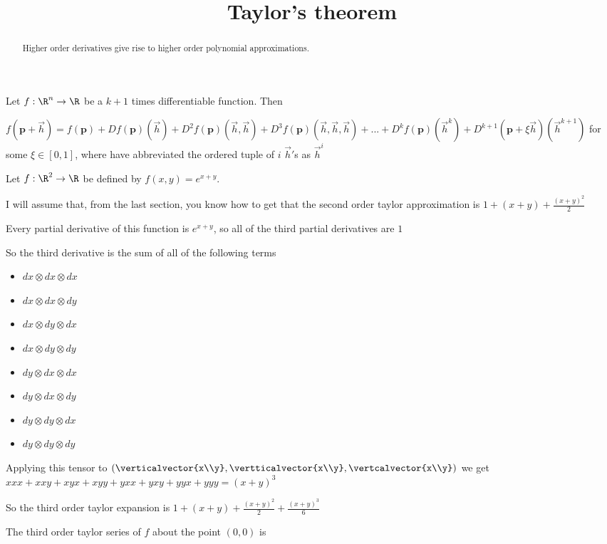 \documentclass{ximera}
\title{Taylor's theorem}
\begin{document}
\begin{abstract}
	Higher order derivatives give rise to higher order polynomial approximations.
\end{abstract}

\begin{theorem}
	Let $f:\R^n \to \R$ be a $k+1$ times differentiable function.  Then
	
	$f(\mathbf{p}+\vec{h}) 
	= f(\mathbf{p})+Df(\mathbf{p})(\vec{h})+D^2f(\mathbf{p})(\vec{h},\vec{h})+D^3f(\mathbf{p})(\vec{h},\vec{h},\vec{h})+...
	+D^kf(\mathbf{p})(\vec{h}^k) + D^{k+1}(\mathbf{p}+\xi\vec{h})(\vec{h}^{k+1})$ for some $\xi \in [0,1]$,  where have abbreviated the 
	ordered tuple of $i$ $\vec{h}'$s as $\vec{h}^i$
\end{theorem}

	\begin{question}
		Let $f:\R^2 \to \R$ be defined by $f(x,y) = e^{x+y}$.  
		\begin{solution}
			\begin{hint}
				I will assume that, from the last section, you know how to get that the second order taylor approximation is $1+(x+y)+\frac{(x+y)^2}{2}$
			\end{hint}
			\begin{hint}
				Every partial derivative of this function is $e^{x+y}$, so all of the third partial derivatives are $1$
			\end{hint}
			\begin{hint}
				So the third derivative is the sum of all of the following terms 
				\begin{itemize}
					\item $dx \otimes dx \otimes dx$
					\item $dx \otimes dx \otimes dy$
					\item $dx \otimes dy \otimes dx$
					\item $dx \otimes dy \otimes dy$
					\item $dy \otimes dx \otimes dx$
					\item $dy \otimes dx \otimes dy$
					\item $dy \otimes dy \otimes dx$
					\item $dy \otimes dy \otimes dy$
				\end{itemize}
			\end{hint}
			\begin{hint}
				Applying this tensor to $(\verticalvector{x\\y},\vertticalvector{x\\y},\vertcalvector{x\\y})$ we get 
				$xxx+xxy+xyx+xyy+yxx+yxy+yyx+yyy = (x+y)^3$
			\end{hint}
			\begin{hint}
				So the third order taylor expansion is $1+(x+y)+\frac{(x+y)^2}{2}+\frac{(x+y)^3}{6}$
			\end{hint}
			The third order taylor series of $f$ about the point $(0,0)$ is 
		\end{solution}
	\end{question}
\end{document}
